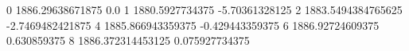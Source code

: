 0 1886.29638671875 0.0
1 1880.5927734375 -5.70361328125
2 1883.5494384765625 -2.7469482421875
4 1885.866943359375 -0.429443359375
6 1886.92724609375 0.630859375
8 1886.372314453125 0.075927734375
